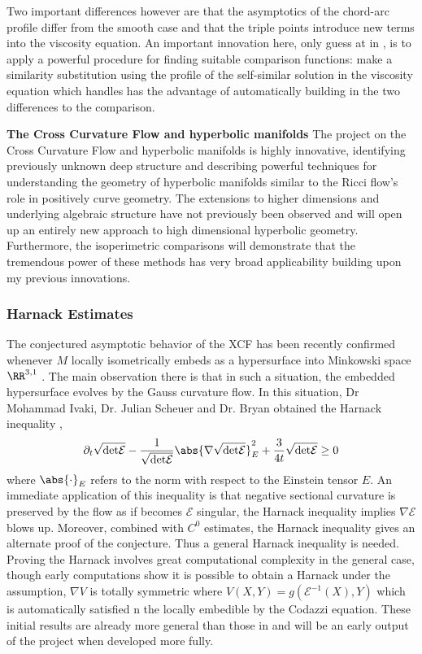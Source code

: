 \documentclass[12pt]{amsart}
\begin{document}
Two important differences however are that the asymptotics of the chord-arc profile differ from the smooth case and that the triple points introduce new terms into the viscosity equation. An important innovation here, only guess at in \cite{MR2794630}, is to apply a powerful procedure for finding suitable comparison functions: make a similarity substitution using the profile of the self-similar solution in the viscosity equation which handles has the advantage of automatically building in the two differences to the comparison.

\noindent\textbf{The Cross Curvature Flow and hyperbolic manifolds}
\label{sec-3-4}
The project on the Cross Curvature Flow and hyperbolic manifolds is highly innovative, identifying previously unknown deep structure and describing powerful techniques for understanding the geometry of hyperbolic manifolds similar to the Ricci flow's role in positively curve geometry. The extensions to higher dimensions and underlying algebraic structure have not previously been observed and will open up an entirely new approach to high dimensional hyperbolic geometry. Furthermore, the isoperimetric comparisons will demonstrate that the tremendous power of these methods has very broad applicability building upon my previous innovations.

\subsubsection*{Harnack Estimates}
\label{sec-3-4-1}
The conjectured asymptotic behavior of the XCF has been recently confirmed whenever $M$ locally isometrically embeds as a hypersurface into Minkowski space $\RR^{3,1}$ \cite{MR3344442}. The main observation there is that in such a situation, the embedded hypersurface evolves by the Gauss curvature flow. In this situation, Dr Mohammad Ivaki, Dr. Julian Scheuer and Dr. Bryan obtained the Harnack inequality \cite{BIS4},
\[
\partial_t \sqrt{{\det} \mathcal{E}} - \frac{1}{\sqrt{{\det}\mathcal{E}}} \abs{\nabla \sqrt{{\det}\mathcal{E}}}_E^2  + \frac{3}{4 t} \sqrt{{\det}\mathcal{E}} \geq 0
\]
where $\abs{\cdot}_E$ refers to the norm with respect to the Einstein tensor $E$. An immediate application of this inequality is that negative sectional curvature is preserved by the flow as if becomes $\mathcal{E}$ singular, the Harnack inequality implies $\nabla \mathcal{E}$ blows up. Moreover, combined with $C^0$ estimates, the Harnack inequality gives an alternate proof of the conjecture. Thus a general Harnack inequality is needed. Proving the Harnack involves great computational complexity in the general case, though early computations show it is possible to obtain a Harnack under the assumption, $\nabla V$ is totally symmetric where $V (X, Y) = g(\mathcal{E}^{-1}(X), Y)$ which is automatically satisfied n the locally embedible by the Codazzi equation. These initial results are already more general than those in \cite{MR3344442} and will be an early output of the project when developed more fully.
\end{document}
